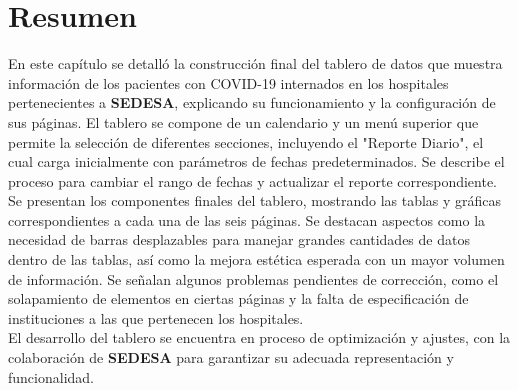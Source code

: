 \section{Resumen}
En este capítulo se detalló la construcción final del tablero de datos que muestra información de los pacientes con COVID-19 internados en los hospitales pertenecientes a \textbf{SEDESA}, explicando su funcionamiento y la configuración de sus páginas. El tablero se compone de un calendario y un menú superior que permite la selección de diferentes secciones, incluyendo el "Reporte Diario", el cual carga inicialmente con parámetros de fechas predeterminados. Se describe el proceso para cambiar el rango de fechas y actualizar el reporte correspondiente.\\

Se presentan los componentes finales del tablero, mostrando las tablas y gráficas correspondientes a cada una de las seis páginas. Se destacan aspectos como la necesidad de barras desplazables para manejar grandes cantidades de datos dentro de las tablas, así como la mejora estética esperada con un mayor volumen de información. Se señalan algunos problemas pendientes de corrección, como el solapamiento de elementos en ciertas páginas y la falta de especificación de instituciones a las que pertenecen los hospitales.\\

El desarrollo del tablero se encuentra en proceso de optimización y ajustes, con la colaboración de \textbf{SEDESA} para garantizar su adecuada representación y funcionalidad.
